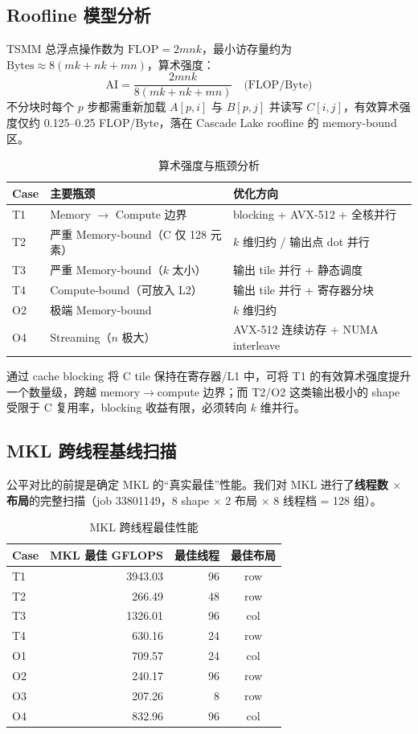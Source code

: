 \documentclass[11pt,a4paper,fontset=fandol]{ctexart}
\begin{document}
\subsection{Roofline 模型分析}
TSMM 总浮点操作数为 $\mathrm{FLOP} = 2mnk$，最小访存量约为 $\mathrm{Bytes} \approx 8(mk + nk + mn)$，算术强度：
\begin{equation}
\mathrm{AI} = \frac{2mnk}{8(mk + nk + mn)} \quad \text{(FLOP/Byte)}
\end{equation}
不分块时每个 $p$ 步都需重新加载 $A[p,i]$ 与 $B[p,j]$ 并读写 $C[i,j]$，有效算术强度仅约 0.125--0.25 FLOP/Byte，落在 Cascade Lake roofline 的 memory-bound 区。

\begin{table}[H]
\centering
\caption{算术强度与瓶颈分析}
\small
\begin{tabular}{lll}
\toprule
Case & 主要瓶颈 & 优化方向 \\
\midrule
T1 & Memory $\to$ Compute 边界 & blocking + AVX-512 + 全核并行 \\
T2 & 严重 Memory-bound（C 仅 128 元素） & $k$ 维归约 / 输出点 dot 并行 \\
T3 & 严重 Memory-bound（$k$ 太小） & 输出 tile 并行 + 静态调度 \\
T4 & Compute-bound（可放入 L2） & 输出 tile 并行 + 寄存器分块 \\
O2 & 极端 Memory-bound & $k$ 维归约 \\
O4 & Streaming（$n$ 极大） & AVX-512 连续访存 + NUMA interleave \\
\bottomrule
\end{tabular}
\end{table}

通过 cache blocking 将 C tile 保持在寄存器/L1 中，可将 T1 的有效算术强度提升一个数量级，跨越 memory$\to$compute 边界；而 T2/O2 这类输出极小的 shape 受限于 C 复用率，blocking 收益有限，必须转向 $k$ 维并行。

\subsection{MKL 跨线程基线扫描}
公平对比的前提是确定 MKL 的“真实最佳”性能。我们对 MKL 进行了\textbf{线程数 $\times$ 布局}的完整扫描（job 33801149，8 shape $\times$ 2 布局 $\times$ 8 线程档 = 128 组）。

\begin{table}[H]
\centering
\caption{MKL 跨线程最佳性能}
\small
\begin{tabular}{lrrc}
\toprule
Case & MKL 最佳 GFLOPS & 最佳线程 & 最佳布局 \\
\midrule
T1 & 3943.03 & 96 & row \\
T2 & 266.49 & 48 & row \\
T3 & 1326.01 & 96 & col \\
T4 & 630.16 & 24 & row \\
O1 & 709.57 & 24 & col \\
O2 & 240.17 & 96 & row \\
O3 & 207.26 & 8 & row \\
O4 & 832.96 & 96 & col \\
\bottomrule
\end{tabular}
\end{table}
\end{document}
